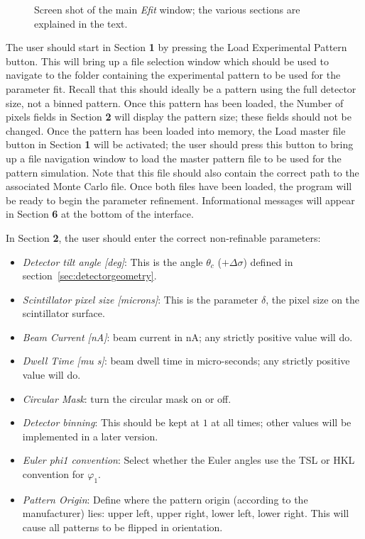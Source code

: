 \documentclass[DIV=calc, paper=letter, fontsize=11pt]{scrartcl}	 %
\begin{document}
\begin{figure}[t]
\centering\leavevmode
\epsfxsize=6.0in
\caption{\label{fig:Efitlayout}Screen shot of the main \textit{Efit} window; the various sections are explained in the text.}
\end{figure}

The user should start in Section \textbf{1} by pressing the \textsf{Load Experimental Pattern} button.  This will bring up a file selection window which
should be used to navigate to the folder containing the experimental pattern to be used for the parameter fit.  Recall that this should ideally be a pattern
using the full detector size, not a binned pattern.  Once this pattern has been loaded, the \textsf{Number of pixels} fields in Section \textbf{2} will display
the pattern size; these fields should not be changed.  Once the pattern has been loaded into memory, the \textsf{Load master file} button in 
Section \textbf{1} will be activated; the user should press this button to bring up a file navigation window to load the master pattern file to be
used for the pattern simulation.  Note that this file should also contain the correct path to the associated Monte Carlo file. Once both files have been
loaded, the program will be ready to begin the parameter refinement.  Informational messages will appear in Section \textbf{6} at the bottom of the 
interface.

In Section \textbf{2}, the user should enter the correct non-refinable parameters:
\begin{itemize}
\item \textit{Detector tilt angle [deg]}: This is the angle $\theta_c$ ($+\Delta\sigma$) defined in section~\ref{sec:detectorgeometry}.
\item \textit{Scintillator pixel size [microns]}: This is the parameter $\delta$, the pixel size on the scintillator surface.
\item \textit{Beam Current [nA]}: beam current in nA; any strictly positive value will do.
\item \textit{Dwell Time [mu s]}: beam dwell time in micro-seconds; any strictly positive value will do.
\item \textit{Circular Mask}: turn the circular mask on or off.
\item \textit{Detector binning}: This should be kept at $1$ at all times; other values will be implemented in a later version.
\item \textit{Euler phi1 convention}: Select whether the Euler angles use the TSL or HKL convention for $\varphi_1$.
\item \textit{Pattern Origin}: Define where the pattern origin (according to the manufacturer) lies: upper left, upper right, lower left, lower right.  This will
cause all patterns to be flipped in orientation.
\end{itemize}
\end{document}
